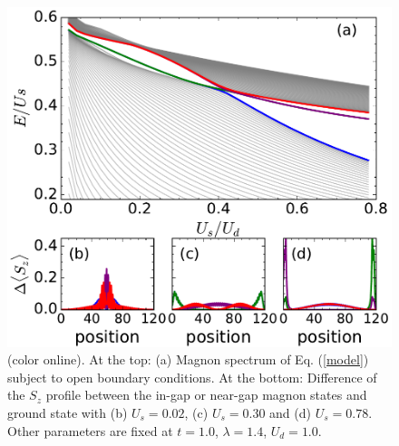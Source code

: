 \documentclass[amsmath,superscriptaddress,showpacs,aps,prb,twocolumn]{revtex4-1}
\begin{document}
\begin{figure}
\includegraphics[scale=0.48]{edge}
\caption{(color online). At the top: (a) Magnon spectrum of Eq. (\ref{model}) subject to open boundary conditions. At the bottom: Difference of the $S_z$ profile between the in-gap or near-gap magnon states and ground state with (b) $U_s=0.02$, (c) $U_s=0.30$ and (d) $U_s=0.78$. Other parameters are fixed at $t=1.0$, $\lambda=1.4$, $U_d=1.0$.}
\label{edge}
\end{figure}
\end{document}
